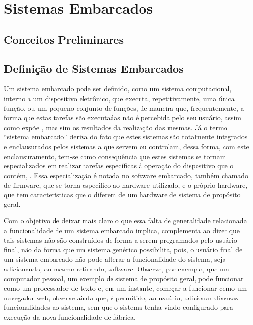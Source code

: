 \section{\textbf{Sistemas Embarcados}}
\label{sec:SistemasEmbarcados}

\subsection{\textbf{Conceitos Preliminares}}
\label{subsec:sub01_Conceitos}


\subsection{\textbf{Definição de Sistemas Embarcados}}
\label{subsec:sub01_Definicao}
Um sistema embarcado pode ser definido, como um sistema computacional, interno a um dispositivo eletrônico, que executa, repetitivamente, uma única função, ou um pequeno conjunto de funções, de maneira que, frequentemente, a forma que estas tarefas são executadas não é percebida pelo seu usuário, assim como expõe , mas sim os resultados da realização das mesmas. Já o termo “sistema embarcado” deriva do fato que estes sistemas são totalmente integrados e enclausurados pelos sistemas a que servem ou controlam, dessa forma, com este enclausuramento, tem-se como consequência que estes sistemas se tornam especializados em realizar tarefas específicas à operação do dispositivo que o contém, \cite[p.~554]{Springer2009}. Essa especialização é notada no software embarcado, também chamado de firmware, que se torna específico ao hardware utilizado, e o próprio hardware, que tem características que o diferem de um hardware de sistema de propósito geral. 

Com o objetivo de deixar mais claro o que essa falta de generalidade relacionada a funcionalidade de um sistema embarcado implica,  complementa ao dizer que tais sistemas não são construídos de forma a serem programados pelo usuário final, não da forma que um sistema genérico possibilita, pois, o usuário final de um sistema embarcado não pode alterar a funcionalidade do sistema, seja adicionando, ou mesmo retirando, software. Observe, por exemplo, que um computador pessoal, um exemplo de sistema de propósito geral, pode funcionar como um processador de texto e, em um instante, começar a funcionar como um navegador web, observe ainda que, é permitido, ao usuário, adicionar diversas funcionalidades ao sistema, sem que o sistema tenha vindo configurado para execução da nova funcionalidade de fábrica. 

